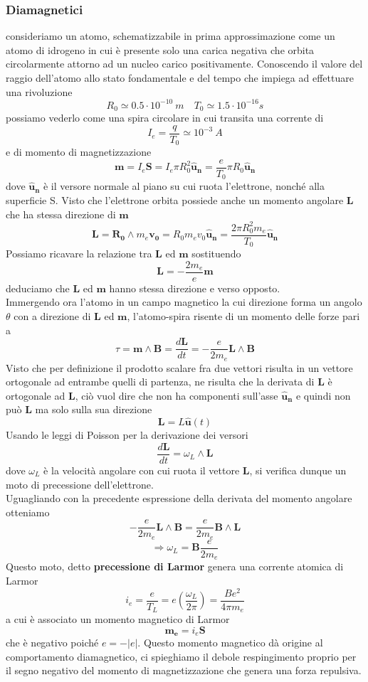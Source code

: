 \documentclass[
10pt, %
a4paper, %
oneside, %
headinclude,footinclude, %
BCOR5mm, %
]{scrartcl}
\begin{document}
\subsubsection{Diamagnetici}
consideriamo un atomo, schematizzabile in prima approssimazione come un atomo di idrogeno in cui è presente solo una carica negativa che orbita circolarmente attorno ad un nucleo carico positivamente. Conoscendo il valore del raggio dell'atomo allo stato fondamentale e del tempo che impiega ad effettuare una rivoluzione
\[R_0 \simeq 0.5\cdot 10^{-10}\ m \quad T_0 \simeq 1.5\cdot 10^{-16}s\]
possiamo vederlo come una spira circolare in cui transita una corrente di
\[I_e = \frac{q}{T_0} \simeq 10^{-3}\ A\]
e di momento di magnetizzazione
\[\mathbf{m} = I_e \mathbf{S} = I_e \pi R_0^2\mathbf{\hat{u}_n} = \frac{e}{T_0}\pi R_0\mathbf{\hat{u}_n}\]
dove \(\mathbf{\hat{u}_n}\) è il versore normale al piano su cui ruota l'elettrone, nonché alla superficie S.  Visto che l'elettrone orbita possiede anche un momento angolare \(\mathbf{L}\) che ha stessa direzione di \(\mathbf{m}\)
\[\mathbf{L} = \mathbf{R_0}\wedge m_e\mathbf{v_0} = R_0 m_e v_0 \mathbf{\hat{u}_n} = \frac{2\pi R_0^2 m_e}{T_0}\mathbf{\hat{u}_n} \]
Possiamo ricavare la relazione tra \(\mathbf{L}\) ed \(\mathbf{m}\) sostituendo
\[\mathbf{L} = -\frac{2 m_e}{e}\mathbf{m}\]
deduciamo che \(\mathbf{L}\) ed \(\mathbf{m}\) hanno stessa direzione e verso opposto.\\
Immergendo ora l'atomo in un campo magnetico la cui direzione forma un angolo $\theta$ con a direzione di \(\mathbf{L}\) ed \(\mathbf{m}\), l'atomo-spira risente di un momento delle forze pari a 
\[\tau = \mathbf{m}\wedge \mathbf{B} = \frac{d\mathbf{L}}{dt} = -\frac{e}{2m_e} \mathbf{L}\wedge \mathbf{B}\]
Visto che per definizione il prodotto scalare fra due vettori risulta in un vettore ortogonale ad entrambe quelli di partenza, ne risulta che la derivata di \(\mathbf{L}\) è ortogonale ad \(\mathbf{L}\), ciò vuol dire che non ha componenti sull'asse \(\mathbf{\hat{u}_n}\) e quindi non può \(\mathbf{L}\) ma solo sulla sua direzione
\[\mathbf{L} = L \mathbf{\hat{u}}(t)\]
Usando le leggi di Poisson per la derivazione dei versori
\[\frac{d\mathbf{L}}{dt} = \omega_L \wedge \mathbf{L}\]
dove \(\omega_L\) è la velocità angolare con cui ruota il vettore \(\mathbf{L}\), si verifica dunque un moto di precessione dell'elettrone.\\
Uguagliando con la precedente espressione della derivata del momento angolare otteniamo
\[-\frac{e}{2m_e} \mathbf{L}\wedge \mathbf{B} = \frac{e}{2m_e} \mathbf{B}\wedge\mathbf{L}\]
\[\Rightarrow \omega_L = \mathbf{B}\frac{e}{2 m_e}\]
Questo moto, detto \textbf{precessione di Larmor} genera una corrente atomica di Larmor
\[i_e = \frac{e}{T_L}= e\left(\frac{\omega_L}{2\pi}\right)=\frac{Be^2}{4\pi m_e}\]
a cui è associato un momento magnetico di Larmor
\[\mathbf{m_e} = i_e \mathbf{S}\]
che è negativo poiché \(e = -|e|\). Questo momento magnetico dà origine al comportamento diamagnetico, ci spieghiamo il debole respingimento proprio per il segno negativo del momento di magnetizzazione che genera una forza repulsiva. 
\end{document}
